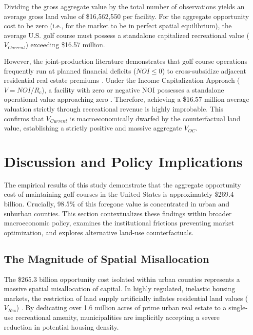 \documentclass[10pt, letterpaper]{article}
\begin{document}
Dividing the gross aggregate value by the total number of observations yields an average gross land value of \$16,562,550 per facility. For the aggregate opportunity cost to be zero (i.e., for the market to be in perfect spatial equilibrium), the average U.S. golf course must possess a standalone capitalized recreational value ($V_{Current}$) exceeding \$16.57 million. 

However, the joint-production literature demonstrates that golf course operations frequently run at planned financial deficits ($NOI \le 0$) to cross-subsidize adjacent residential real estate premiums \parencite{Limehouse2012}. Under the Income Capitalization Approach ($V = NOI / R_c$), a facility with zero or negative NOI possesses a standalone operational value approaching zero \parencite{AppraisalInstitute2020}. Therefore, achieving a \$16.57 million average valuation strictly through recreational revenue is highly improbable. This confirms that $V_{Current}$ is macroeconomically dwarfed by the counterfactual land value, establishing a strictly positive and massive aggregate $V_{OC}$.

\newpage

\section{Discussion and Policy Implications}

The empirical results of this study demonstrate that the aggregate opportunity cost of maintaining golf courses in the United States is approximately \$269.4 billion. Crucially, 98.5\% of this foregone value is concentrated in urban and suburban counties. This section contextualizes these findings within broader macroeconomic policy, examines the institutional frictions preventing market optimization, and explores alternative land-use counterfactuals.

\subsection{The Magnitude of Spatial Misallocation}
The \$265.3 billion opportunity cost isolated within urban counties represents a massive spatial misallocation of capital. In highly regulated, inelastic housing markets, the restriction of land supply artificially inflates residential land values ($V_{Res}$) \parencite{Glaeser2005, Davis2021}. By dedicating over 1.6 million acres of prime urban real estate to a single-use recreational amenity, municipalities are implicitly accepting a severe reduction in potential housing density. 
\end{document}
